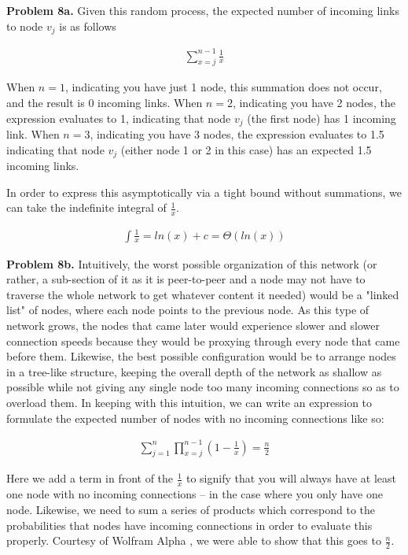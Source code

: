 \documentclass{article}
\begin{document}
\hfill

\textbf{Problem 8a.} Given this random process, the expected number of incoming links to node $v_j$ is as follows

\begin{gather}
    \sum_{x=j}^{n-1} \frac{1}{x}
\end{gather}

When $n = 1$, indicating you have just 1 node, this summation does not occur, and the result is 0 incoming links. When $n=2$, indicating you have 2 nodes, the expression evaluates to 1, indicating that node $v_j$ (the first node) has 1 incoming link. When $n=3$, indicating you have 3 nodes, the expression evaluates to 1.5 indicating that node $v_j$ (either node 1 or 2 in this case) has an expected 1.5 incoming links.

In order to express this asymptotically via a tight bound without summations, we can take the indefinite integral of $\frac{1}{x}$.

\begin{gather}
    \int \frac{1}{x} = ln(x) + c = \Theta(ln(x))
\end{gather}

\textbf{Problem 8b.} Intuitively, the worst possible organization of this network (or rather, a sub-section of it as it is peer-to-peer and a node may not have to traverse the whole network to get whatever content it needed) would be a "linked list" of nodes, where each node points to the previous node. As this type of network grows, the nodes that came later would experience slower and slower connection speeds because they would be proxying through every node that came before them. Likewise, the best possible configuration would be to arrange nodes in a tree-like structure, keeping the overall depth of the network as shallow as possible while not giving any single node too many incoming connections so as to overload them. In keeping with this intuition, we can write an expression to formulate the expected number of nodes with no incoming connections like so:

\begin{gather}
    \sum_{j=1}^{n}\prod_{x=j}^{n-1} (1 - \frac{1}{x}) = \frac{n}{2}
\end{gather}

Here we add a term in front of the $\frac{1}{x}$ to signify that you will always have at least one node with no incoming connections -- in the case where you only have one node. Likewise, we need to sum a series of products which correspond to the probabilities that nodes have incoming connections in order to evaluate this properly. Courtesy of Wolfram Alpha \cite{website:7}, we were able to show that this goes to $\frac{n}{2}$.


\newpage
 

\end{document}
